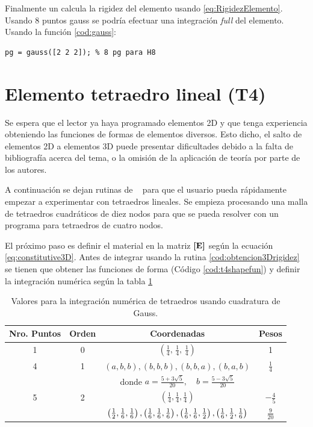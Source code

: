 Finalmente un calcula la rigidez del elemento usando \eqref{eq:RigidezElemento}. Usando 8 puntos gauss se podría efectuar una integración \textit{full} del elemento. Usando la función \ref{cod:gauss}:
\begin{lstlisting}
pg = gauss([2 2 2]); % 8 pg para H8 
\end{lstlisting}

\section{Elemento tetraedro lineal (T4)}
Se espera que el lector ya haya programado elementos 2D y que tenga experiencia obteniendo las funciones de formas de elementos diversos. Esto dicho, el salto de elementos 2D a elementos 3D puede presentar dificultades debido a la falta de bibliografía acerca del tema, o la omisión de la aplicación de teoría por parte de los autores.

A continuación se dejan rutinas de \Matlab~ para que el usuario pueda rápidamente empezar a experimentar con tetraedros lineales. Se empieza procesando una malla de tetraedros cuadráticos de diez nodos para que se pueda resolver con un programa para tetraedros de cuatro nodos.



El próximo paso es definir el material en la matriz $\boldsymbol{[}\mathbf{E} \boldsymbol{]}$ según la ecuación \eqref{eq:constitutive3D}. Antes de integrar usando la rutina \ref{cod:obtencion3Drigidez} se tienen que obtener las funciones de forma (Código \ref{cod:t4shapefun}) y definir la integración numérica según la tabla \ref{tab:gausstetraedros}




\begin{table}[htb!]
	\centering
	\begin{tabular}{cccc}
		Nro. Puntos & Orden & Coordenadas & Pesos \\ \hline \hline
		1 & 0 & \( \left(\frac{1}{4}, \,\frac{1}{4}, \, \frac{1}{4} \right)\) & 1 \\ [1pt] \hline
		4 & 1 & \(  (a,b,b), (b,b,b), (b,b,a), (b,a,b) \) & \( \frac{1}{4}\) \\ [2pt]
		&   &donde    \( a = \frac{5+3\sqrt{5}}{20}, \quad b =\frac{5-3\sqrt{5}}{20} \) & \\[2pt] \hline 
		5 & 2 & \( \left(\frac{1}{4}, \frac{1}{4}, \frac{1}{4} \right)\) & \( -\frac{4}{5}\)   \\[5pt]
		&   &  \( \left(\frac{1}{2},\frac{1}{6}, \frac{1}{6} \right), \left(\frac{1}{6},\frac{1}{6}, \frac{1}{6} \right), \left(\frac{1}{6},\frac{1}{6}, \frac{1}{2} \right), \left(\frac{1}{6},\frac{1}{2}, \frac{1}{6} \right) \) & \(\frac{9}{20}\)
	\end{tabular}
	\caption{Valores para la integración numérica de tetraedros usando cuadratura de Gauss.}
	\label{tab:gausstetraedros}
\end{table}

